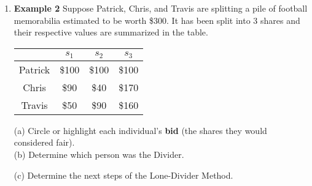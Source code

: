 \documentclass[12pt]{article}
\begin{document}
\begin{enumerate}
\begin{multicols}{2}
(b) Determine which person was the Divider.
\end{multicols}
(c) Determine the next steps of the Lone-Divider Method.
\vfill
\item \textbf{Example 2} Suppose Patrick, Chris, and Travis are splitting a pile of football memorabilia estimated to be worth \$300. It has been split into 3 shares and their respective values are summarized in the table.
\begin{multicols}{2}
\begin{tabular}{c||c|c|c}
&$s_1$&$s_2$&$s_3$\\
\hline \hline
Patrick&\$100&\$100&\$100\\
Chris&\$90&\$40&\$170\\
Travis&\$50&\$90&\$160\\
\end{tabular} 

(a) Circle or highlight each individual's \textbf{bid} (the shares they would considered fair).\\

(b) Determine which person was the Divider.
\end{multicols}
(c) Determine the next steps of the Lone-Divider Method.
\vfill

\end{enumerate}
\end{document}
